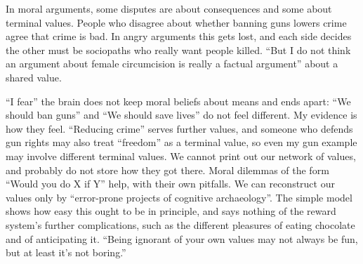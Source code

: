 In moral arguments, some disputes are about consequences and some about terminal values. People who disagree about whether banning guns lowers crime agree that crime is bad. In angry arguments this gets lost, and each side decides the other must be sociopaths who really want people killed. ``But I do not think an argument about female circumcision is really a factual argument'' about a shared value. 

``I fear'' the brain does not keep moral beliefs about means and ends apart: ``We should ban guns'' and ``We should save lives'' do not feel different. My evidence is how they feel. ``Reducing crime'' serves further values, and someone who defends gun rights may also treat ``freedom'' as a terminal value, so even my gun example may involve different terminal values. We cannot print out our network of values, and probably do not store how they got there. Moral dilemmas of the form ``Would you do X if Y'' help, with their own pitfalls. We can reconstruct our values only by ``error-prone projects of cognitive archaeology''. The simple model shows how easy this ought to be in principle, and says nothing of the reward system's further complications, such as the different pleasures of eating chocolate and of anticipating it. ``Being ignorant of your own values may not always be fun, but at least it's not boring.''
